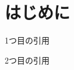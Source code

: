 \documentclass[a4paper,11pt]{jsarticle}
\begin{document}
\section{はじめに}
1つ目の引用\cite{cite1}


2つ目の引用\cite{cite2}



\end{document}
